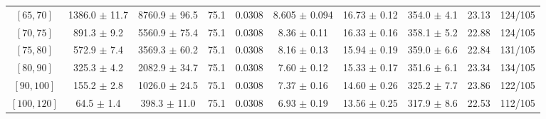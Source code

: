 \begin{tabular}{c||c|c|c|c|c|c|c||c|c}
$[65, 70]$ & 1386.0 $\pm$ 11.7 & 8760.9 $\pm$ 96.5 & 75.1 & 0.0308 & 8.605 $\pm$ 0.094 & 16.73 $\pm$ 0.12 & 354.0 $\pm$ 4.1 & 23.13 & 124/105\\
$[70, 75]$ & 891.3 $\pm$ 9.2 & 5560.9 $\pm$ 75.4 & 75.1 & 0.0308 & 8.36 $\pm$ 0.11 & 16.33 $\pm$ 0.16 & 358.1 $\pm$ 5.2 & 22.88 & 124/105\\
$[75, 80]$ & 572.9 $\pm$ 7.4 & 3569.3 $\pm$ 60.2 & 75.1 & 0.0308 & 8.16 $\pm$ 0.13 & 15.94 $\pm$ 0.19 & 359.0 $\pm$ 6.6 & 22.84 & 131/105\\
$[80, 90]$ & 325.3 $\pm$ 4.2 & 2082.9 $\pm$ 34.7 & 75.1 & 0.0308 & 7.60 $\pm$ 0.12 & 15.33 $\pm$ 0.17 & 351.6 $\pm$ 6.1 & 23.34 & 134/105\\
$[90, 100]$ & 155.2 $\pm$ 2.8 & 1026.0 $\pm$ 24.5 & 75.1 & 0.0308 & 7.37 $\pm$ 0.16 & 14.60 $\pm$ 0.26 & 325.2 $\pm$ 7.7 & 23.86 & 122/105\\
$[100, 120]$ & 64.5 $\pm$ 1.4 & 398.3 $\pm$ 11.0 & 75.1 & 0.0308 & 6.93 $\pm$ 0.19 & 13.56 $\pm$ 0.25 & 317.9 $\pm$ 8.6 & 22.53 & 112/105\\
\end{tabular}
